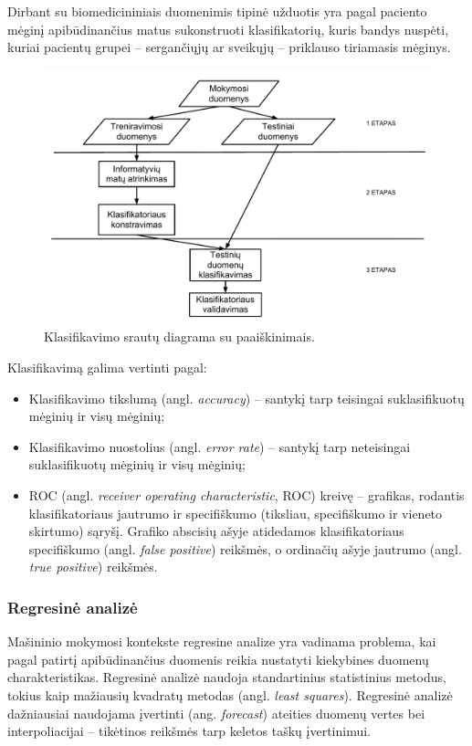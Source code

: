 Dirbant su biomedicininiais duomenimis tipinė užduotis yra pagal paciento mėginį apibūdinančius matus sukonstruoti klasifikatorių, kuris bandys nuspėti, kuriai pacientų grupei -- sergančiųjų ar sveikųjų -- priklauso tiriamasis mėginys.
\begin{figure}
 \centering
 \includegraphics[width=\textwidth]{images/classification_process.pdf}
 \caption{Klasifikavimo srautų diagrama su paaiškinimais.}
 \label{fig:classification_process}
\end{figure}
Klasifikavimą galima vertinti pagal:
\begin{itemize}
 \item Klasifikavimo tikslumą (angl. \textit{accuracy}) -- santykį tarp teisingai suklasifikuotų mėginių ir visų mėginių;
 \item Klasifikavimo nuostolius (angl. \textit{error rate}) -- santykį tarp neteisingai suklasifikuotų mėginių ir visų mėginių;
 \item ROC (angl. \textit{receiver operating characteristic}, ROC) kreivę -- grafikas, rodantis klasifikatoriaus jautrumo ir specifiškumo (tiksliau, specifiškumo ir vieneto skirtumo) sąryšį. Grafiko abscisių ašyje atidedamos klasifikatoriaus specifiškumo (angl. \textit{false positive}) reikšmės, o ordinačių ašyje jautrumo (angl. \textit{true positive}) reikšmės.
\end{itemize}

\subsubsection{Regresinė analizė}

Mašininio mokymosi kontekste regresine analize yra vadinama problema, kai pagal patirtį apibūdinančius duomenis reikia nustatyti kiekybines duomenų charakteristikas. Regresinė analizė naudoja standartinius statistinius metodus, tokius kaip mažiausių kvadratų metodas (angl. \textit{least squares}). Regresinė analizė dažniausiai naudojama įvertinti (ang. \textit{forecast}) ateities duomenų vertes bei interpoliacijai -- tikėtinos reikšmės tarp keletos taškų įvertinimui. 

